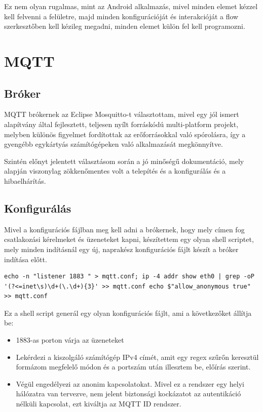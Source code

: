 \documentclass[]{thesis-ekf}
\theoremstyle{definition}
\theoremstyle{remark}
\begin{document}
Ez nem olyan rugalmas, mint az Android alkalmazás, mivel minden
elemet kézzel kell felvenni a felületre, majd minden konfigurációját és interakcióját a flow szerkesztőben kell kézileg megadni, minden elemet külön fel kell programozni.

\section{MQTT}
\subsection{Bróker}
MQTT brókernek az Eclipse Mosquitto\cite{mosquitto}-t választottam, mivel egy jól ismert alapítvány által fejlesztett, teljesen nyílt forráskódú multi-platform projekt,
melyben különös figyelmet fordítottak az erőforrásokkal való spórolásra, így a gyengébb egykártyás számítógépeken való alkalmazását megkönnyítve. 

Szintén előnyt jelentett választásom során a jó minőségű dokumentáció, mely alapján
viszonylag zökkenőmentes volt a telepítés és a konfigurálás és a hibaelhárítás.
\subsection{Konfigurálás}
Mivel a konfigurációs fájlban meg kell adni a brókernek, hogy mely címen fog csatlakozási kérelmeket és üzeneteket kapni,
készítettem egy olyan shell scriptet, mely minden indításnál egy új, naprakész konfigurációs fájlt készít a bróker indítása előtt.

\lstset{language=bash} 
\label{configGenerator}
\begin{lstlisting}[frame=single]
echo -n "listener 1883 " > mqtt.conf; ip -4 addr show eth0 | grep -oP '(?<=inet\s)\d+(\.\d+){3}' >> mqtt.conf echo $"allow_anonymous true" >> mqtt.conf
\end{lstlisting}

Ez a shell script generál egy olyan konfigurációs fájlt, ami a következőket állítja be:
\begin{itemize}
	\item 1883-as porton várja az üzeneteket
	\item Lekérdezi a kiszolgáló számítógép IPv4 címét, amit egy regex szűrőn keresztül formázom megfelelő módon és a portszám után illesztem be, előírás szerint.
	\item Végül engedélyezi az anonim kapcsolatokat. Mivel ez a rendszer egy helyi hálózatra van tervezve, nem jelent biztonsági kockázatot az autentikáció nélküli kapcsolat, ezt kiváltja az MQTT ID rendszer.
\end{itemize}
\end{document}
